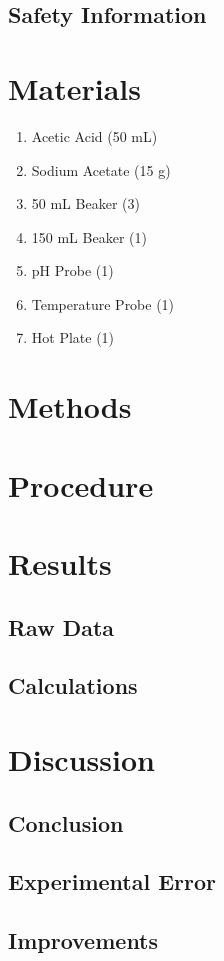 \documentclass{article}
\begin{document}
\subsection*{Safety Information}%

\section*{Materials} %
\begin{enumerate}
\item Acetic Acid (50 mL)
\item Sodium Acetate (15 g)
\item 50 mL Beaker (3)
\item 150 mL Beaker (1)
\item pH Probe (1)
\item Temperature Probe (1)
\item Hot Plate (1)
\end{enumerate}
\section*{Methods}%

\section*{Procedure} %

\section*{Results} %
\subsection*{Raw Data} %

\subsection*{Calculations}%

\section*{Discussion}%
\subsection*{Conclusion}

\subsection*{Experimental Error} %

\subsection*{Improvements} %
\end{document}
